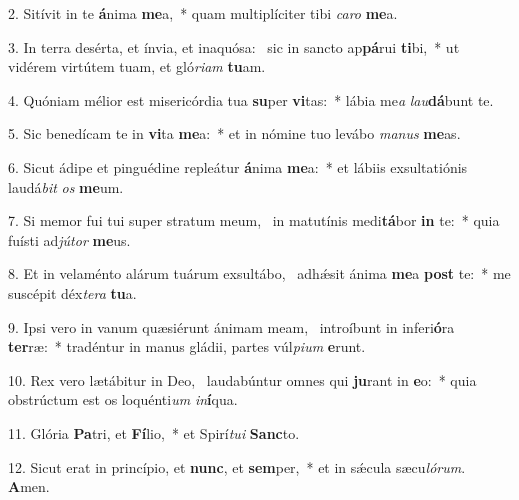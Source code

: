2. Sitívit in te \textbf{á}nima \textbf{me}a,~*  quam multiplíciter tibi \textit{ca}\textit{ro} \textbf{me}a.\

3. In terra desérta, et ínvia, et inaquósa: \dag\  sic in sancto ap\textbf{pá}rui \textbf{ti}bi,~*  ut vidérem virtútem tuam, et gló\textit{ri}\textit{am} \textbf{tu}am.\

4. Quóniam mélior est misericórdia tua \textbf{su}per \textbf{vi}tas:~*  lábia me\textit{a} \textit{lau}\textbf{dá}bunt te.\

5. Sic benedícam te in \textbf{vi}ta \textbf{me}a:~*  et in nómine tuo levábo \textit{ma}\textit{nus} \textbf{me}as.\

6. Sicut ádipe et pinguédine repleátur \textbf{á}nima \textbf{me}a:~*  et lábiis exsultatiónis laudá\textit{bit} \textit{os} \textbf{me}um.\

7. Si memor fui tui super stratum meum, \dag\  in matutínis medi\textbf{tá}bor \textbf{in} te:~*  quia fuísti ad\textit{jú}\textit{tor} \textbf{me}us.\

8. Et in velaménto alárum tuárum exsultábo, \dag\  adhǽsit ánima \textbf{me}a \textbf{post} te:~*  me suscépit déx\textit{te}\textit{ra} \textbf{tu}a.\

9. Ipsi vero in vanum quæsiérunt ánimam meam, \dag\  introíbunt in inferi\textbf{ó}ra \textbf{ter}ræ:~*  tradéntur in manus gládii, partes vúl\textit{pi}\textit{um} \textbf{e}runt.\

10. Rex vero lætábitur in Deo, \dag\  laudabúntur omnes qui \textbf{ju}rant in \textbf{e}o:~*  quia obstrúctum est os loquénti\textit{um} \textit{in}\textbf{í}qua.\

11. Glória \textbf{Pa}tri, et \textbf{Fí}lio,~*  et Spirí\textit{tu}\textit{i} \textbf{Sanc}to.\

12. Sicut erat in princípio, et \textbf{nunc}, et \textbf{sem}per,~*  et in sǽcula sæcu\textit{ló}\textit{rum}. \textbf{A}men.\

